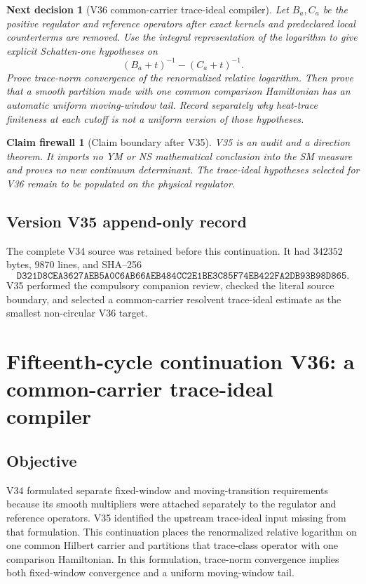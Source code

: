 \documentclass[11pt]{article}
\newtheorem{firewall}[theorem]{Claim firewall}
\newtheorem{decision}[theorem]{Next decision}
\theoremstyle{remark}
\begin{document}
\begin{decision}[V36 common-carrier trace-ideal compiler]
\label{dec:v15v35-next}
Let \(B_a,C_a\) be the positive regulator and reference operators
after exact kernels and predeclared local counterterms are removed.
Use the integral representation of the logarithm to give explicit
Schatten-one hypotheses on
\[
 (B_a+t)^{-1}-(C_a+t)^{-1}.                              \tag{35.6}
\]
Prove trace-norm convergence of the renormalized relative
logarithm.  Then prove that a smooth partition made with one common
comparison Hamiltonian has an automatic uniform moving-window tail.
Record separately why heat-trace finiteness at each cutoff is not a
uniform version of those hypotheses.
\end{decision}

\begin{firewall}[Claim boundary after V35]
\label{fire:v15v35}
V35 is an audit and a direction theorem.  It imports no YM or NS
mathematical conclusion into the SM measure and proves no new
continuum determinant.  The trace-ideal hypotheses selected for V36
remain to be populated on the physical regulator.
\end{firewall}

\section*{Version V35 append-only record}
The complete V34 source was retained before this continuation.  It
had \(342352\) bytes, \(9870\) lines, and SHA--256
\[
 \texttt{D321D8CEA3627AEB5A0C6AB66AEB484CC2E1BE3C85F74EB422FA2DB93B98D865}.
\]
V35 performed the compulsory companion review, checked the literal
source boundary, and selected a common-carrier resolvent
trace-ideal estimate as the smallest non-circular V36 target.

\chapter{Fifteenth-cycle continuation V36: a common-carrier trace-ideal compiler}
\label{sec:v15v36}

\section{Objective}

V34 formulated separate fixed-window and moving-transition
requirements because its smooth multipliers were attached separately
to the regulator and reference operators.  V35 identified the
upstream trace-ideal input missing from that formulation.  This
continuation places the renormalized relative logarithm on one common
Hilbert carrier and partitions that trace-class operator with one
comparison Hamiltonian.  In this formulation, trace-norm convergence
implies both fixed-window convergence and a uniform moving-window
tail.
\end{document}
